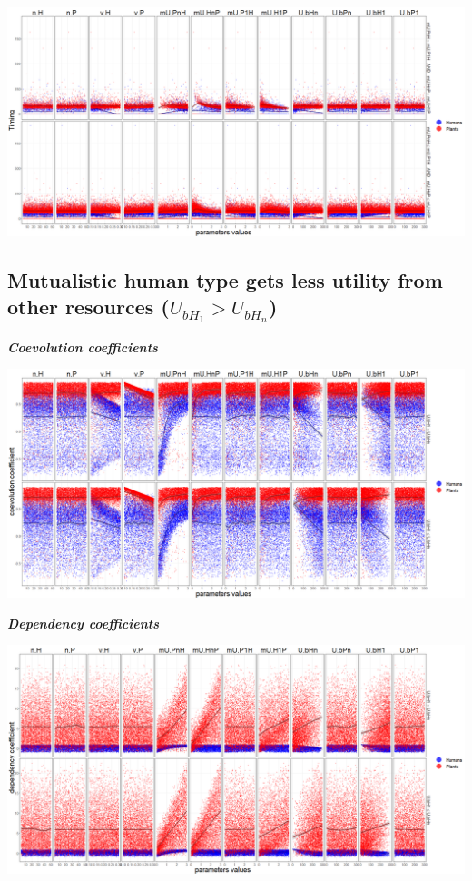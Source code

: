 \documentclass[]{book}
\begin{document}
\includegraphics[width=1\linewidth]{plots/5_multiplePar-timing-bothImprove-ggplot}

\newpage

\hypertarget{mutualistic-human-type-gets-less-utility-from-other-resources-u_bh_1u_bh_n}{%
\subsection{\texorpdfstring{Mutualistic human type gets less utility from other resources (\(U_{bH_{1}}>U_{bH_{n}}\))}{Mutualistic human type gets less utility from other resources (U\_\{bH\_\{1\}\}\textgreater{}U\_\{bH\_\{n\}\})}}\label{mutualistic-human-type-gets-less-utility-from-other-resources-u_bh_1u_bh_n}}

\textbf{\emph{Coevolution coefficients}}

\includegraphics[width=1\linewidth]{plots/5_multiplePar-coevo-humanLessBase-ggplot}

\textbf{\emph{Dependency coefficients}}

\includegraphics[width=1\linewidth]{plots/5_multiplePar-depend-humanLessBase-ggplot}
\end{document}
